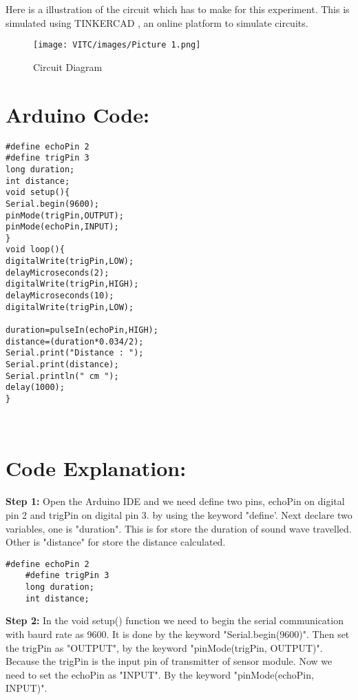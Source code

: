 Here is a illustration of the circuit which has to make for this experiment. This is simulated using TINKERCAD , an online platform to simulate circuits.
\begin{figure}[ht]
\texttt{[image: VITC/images/Picture 1.png]}
\caption{Circuit Diagram}
\end{figure}


\section{Arduino Code:}
\lstset{language=Python}
\lstset{frame=lines}
\lstset{basicstyle=\footnotesize}
\begin{lstlisting}
#define echoPin 2
#define trigPin 3
long duration;
int distance;
void setup(){
Serial.begin(9600);
pinMode(trigPin,OUTPUT);
pinMode(echoPin,INPUT);
}
void loop(){
digitalWrite(trigPin,LOW);
delayMicroseconds(2);
digitalWrite(trigPin,HIGH);
delayMicroseconds(10);
digitalWrite(trigPin,LOW);

duration=pulseIn(echoPin,HIGH);
distance=(duration*0.034/2);
Serial.print("Distance : ");
Serial.print(distance);
Serial.println(" cm ");
delay(1000);
}

\end{lstlisting}



\\
\section{Code Explanation:}
\textbf{Step 1:}
    Open the Arduino IDE and we need define two pins, echoPin on digital pin 2 and trigPin on digital pin 3. by using the keyword "define'. Next declare two variables, one is "duration". This is for store the duration of sound wave travelled. Other is "distance" for store the distance calculated.\\
\lstset{language=Python}
\lstset{frame=lines}

\lstset{basicstyle=\footnotesize}
\begin{lstlisting}
#define echoPin 2
	#define trigPin 3
	long duration;
	int distance;
\end{lstlisting}


\textbf{Step 2:}
    In the void setup() function we need to begin the serial communication with baurd rate as 9600. It is done by the keyword "Serial.begin(9600)". Then set the trigPin as "OUTPUT", by the keyword "pinMode(trigPin, OUTPUT)". Because the trigPin is the input pin of transmitter of sensor module. Now we need to set the echoPin as "INPUT". By the keyword "pinMode(echoPin, INPUT)".\\
\lstset{language=Python}
\lstset{frame=lines}

